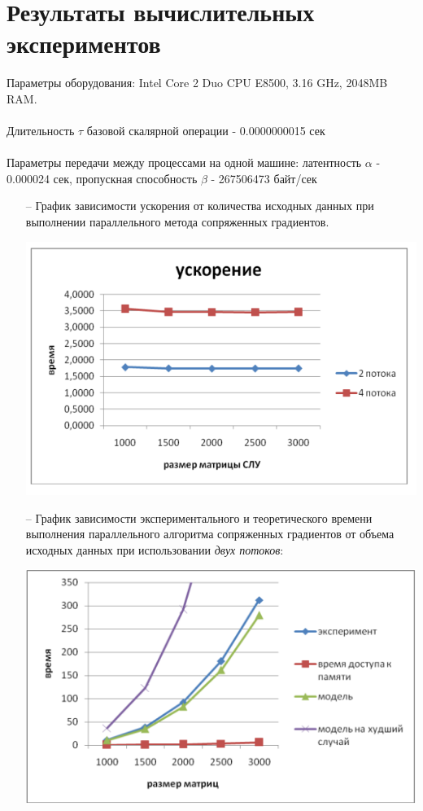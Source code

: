 \documentclass[12pt]{article}
\begin{document}
\section{\LARGE Результаты вычислительных экспериментов}
Параметры оборудования: Intel Core 2 Duo CPU E8500,  3.16 GHz, 2048MB RAM.\\\\
Длительность $\tau$ базовой скалярной операции - 0.0000000015 сек\\\\
Параметры передачи между процессами на одной машине: латентность $\alpha$ - 0.000024 сек, пропускная способность $\beta$ - 267506473 байт/сек
\begin{itemize}
	\item [--]График зависимости ускорения от количества исходных данных при выполнении параллельного метода сопряженных градиентов.
	\begin{center}
	\includegraphics[width=\textwidth]{acc1}
	\end{center}
	\item [--]График зависимости экспериментального и теоретического времени выполнения параллельного алгоритма сопряженных градиентов от объема исходных данных при использовании \emph{двух потоков}: 
	\begin{center}
	\includegraphics[width=\textwidth]{gra2}

\end{center}
\end{itemize}
\end{document}
